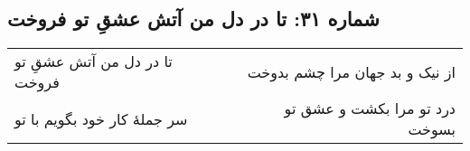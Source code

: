 \begin{center}
\section*{شماره ۳۱: تا در دل من آتش عشقِ تو فروخت}
\label{sec:031}
\begin{longtable}{l p{0.5cm} r}
تا در دل من آتش عشقِ تو فروخت
&&
از نیک و بد جهان مرا چشم بدوخت
\\
سر جملهٔ کار خود بگویم با تو
&&
درد تو مرا بکشت و عشق تو بسوخت
\\
\end{longtable}
\end{center}
